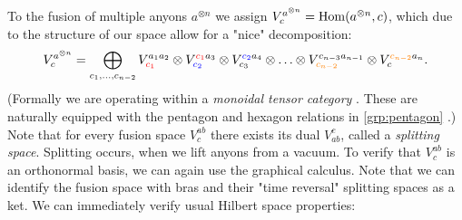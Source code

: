 \documentclass{article}
\begin{document}
To the fusion of multiple anyons $a^{\otimes n}$ we assign $V^{a^{\otimes n}}_c = \operatorname{Hom}(a^{\otimes n}, c)$, which due to the structure of our space allow for a "nice" decomposition: 
\[
  {V}^{a^{\otimes n}}_{c} = \bigoplus_{c_{1}, \ldots , c_{n-2}  } V^{a_1 a_2}_{{\color{red}c_1}} \otimes V^{{\color{red}c_1} a_3}_{{\color{blue}c_2}} \otimes V^{{\color{blue}c_2} a_4}_{c_3} \otimes \ldots \otimes V^{{c_{n-3}} a_{n-1}}_{\color{orange}c_{n-2}} \otimes V^{{\color{orange}c_{n-2}} a_n}_{c}.
\] (Formally we are operating within a {\it monoidal tensor category} \cite{rowell_mathematics_2017}. These are naturally equipped with the pentagon and hexagon relations in \cref{grp:pentagon} \cite{gelaki_tensor_2015}.) Note that for every fusion space $V^{ab}_{c}$ there exists its dual $V^{c}_{ab}$, called a {\it splitting space}. Splitting occurs, when we lift anyons from a vacuum. To verify that $V^{ab}_{c}$ is an orthonormal basis, we can again use the graphical calculus. Note that we can identify the fusion space with bras and their "time reversal" splitting spaces as a ket. We can immediately verify usual Hilbert space properties:
\end{document}
